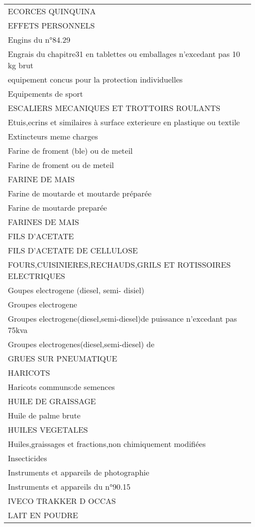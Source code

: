 \documentclass[
]{book}
\begin{document}
\begin{longtable}[t]{l}
ECORCES QUINQUINA\\
EFFETS PERSONNELS\\
Engins du n°84.29\\
Engrais du chapitre31 en tablettes ou emballages n'excedant pas 10 kg brut\\
\addlinespace
equipement concus pour la protection individuelles\\
Equipements de sport\\
ESCALIERS MECANIQUES ET TROTTOIRS ROULANTS\\
Etuis,ecrins et similaires à surface exterieure en plastique ou textile\\
Extincteurs meme charges\\
\addlinespace
Farine de froment (ble) ou de meteil\\
Farine de froment ou de meteil\\
FARINE DE MAIS\\
Farine de moutarde et moutarde préparée\\
Farine de moutarde preparée\\
\addlinespace
FARINES DE MAIS\\
FILS D'ACETATE\\
FILS D'ACETATE DE CELLULOSE\\
FOURS,CUISINIERES,RECHAUDS,GRILS ET ROTISSOIRES  ELECTRIQUES\\
Goupes electrogene (diesel, semi- disiel)\\
\addlinespace
Groupes electrogene\\
Groupes electrogene(diesel,semi-diesel)de puissance n'excedant pas 75kva\\
Groupes electrogenes(diesel,semi-diesel) de\\
GRUES SUR PNEUMATIQUE\\
HARICOTS\\
\addlinespace
Haricots communs:de semences\\
HUILE DE GRAISSAGE\\
Huile de palme brute\\
HUILES VEGETALES\\
Huiles,graissages et fractions,non chimiquement modifiées\\
\addlinespace
Insecticides\\
Instruments et appareils de photographie\\
Instruments et appareils du n°90.15\\
IVECO TRAKKER D OCCAS\\
LAIT EN POUDRE\\

\end{longtable}
\end{document}
